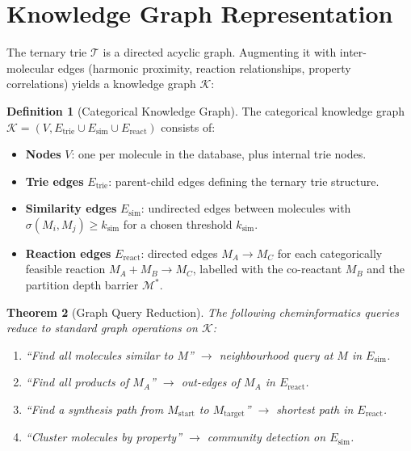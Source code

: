 \documentclass[11pt,twocolumn,a4paper]{article}
\newtheorem{theorem}{Theorem}[section]
\theoremstyle{definition}
\newtheorem{definition}[theorem]{Definition}
\theoremstyle{remark}
\newcommand{\Depth}{\mathcal{M}}
\newcommand{\Trie}{\mathcal{T}}
\newcommand{\KGraph}{\mathcal{K}}
\begin{document}
\section{Knowledge Graph Representation}
\label{sec:knowledge_graph}

The ternary trie $\Trie$ is a directed acyclic graph. Augmenting it with inter-molecular edges (harmonic proximity, reaction relationships, property correlations) yields a knowledge graph $\KGraph$:

\begin{definition}[Categorical Knowledge Graph]
\label{def:knowledge_graph}
The categorical knowledge graph $\KGraph = (V, E_{\mathrm{trie}} \cup E_{\mathrm{sim}} \cup E_{\mathrm{react}})$ consists of:
\begin{itemize}[nosep]
\item \textbf{Nodes} $V$: one per molecule in the database, plus internal trie nodes.
\item \textbf{Trie edges} $E_{\mathrm{trie}}$: parent-child edges defining the ternary trie structure.
\item \textbf{Similarity edges} $E_{\mathrm{sim}}$: undirected edges between molecules with $\sigma(M_i, M_j) \geq k_{\mathrm{sim}}$ for a chosen threshold $k_{\mathrm{sim}}$.
\item \textbf{Reaction edges} $E_{\mathrm{react}}$: directed edges $M_A \to M_C$ for each categorically feasible reaction $M_A + M_B \to M_C$, labelled with the co-reactant $M_B$ and the partition depth barrier $\Depth^*$.
\end{itemize}
\end{definition}

\begin{theorem}[Graph Query Reduction]
\label{thm:graph_query}
The following cheminformatics queries reduce to standard graph operations on $\KGraph$:
\begin{enumerate}[nosep]
\item ``Find all molecules similar to $M$'' $\to$ neighbourhood query at $M$ in $E_{\mathrm{sim}}$.
\item ``Find all products of $M_A$'' $\to$ out-edges of $M_A$ in $E_{\mathrm{react}}$.
\item ``Find a synthesis path from $M_{\mathrm{start}}$ to $M_{\mathrm{target}}$'' $\to$ shortest path in $E_{\mathrm{react}}$.
\item ``Cluster molecules by property'' $\to$ community detection on $E_{\mathrm{sim}}$.
\end{enumerate}
\end{theorem}
\end{document}

